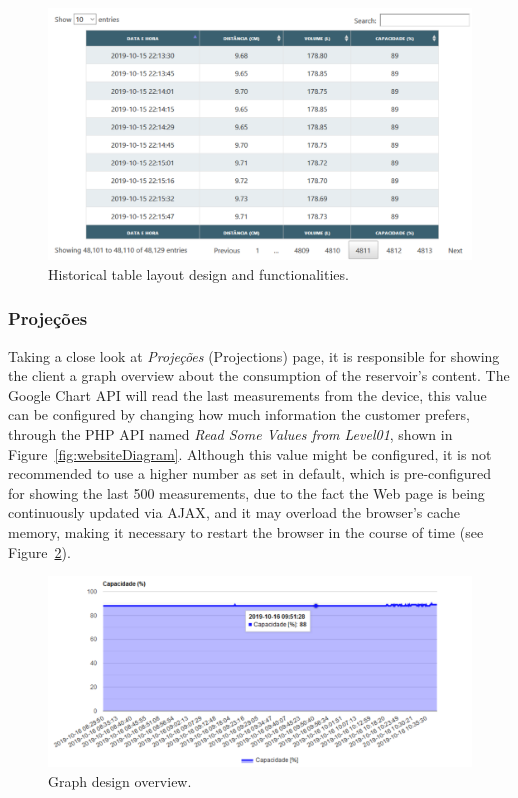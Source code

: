 \begin{figure}[h!]
    \centering
    \includegraphics[scale=0.6]{images/Development/web_database/historico1.pdf}
    \caption{Historical table layout design and functionalities.}
    \label{fig:historicTable}
\end{figure}


\subsubsection{Projeções}

Taking a close look at \textit{Projeções} (Projections) page, it is responsible for showing the client a graph overview about the consumption of the reservoir's content. The Google Chart \gls{API} will read the last measurements from the device, this value can be configured by changing how much information the customer prefers, through the \gls{PHP} \gls{API} named \textit{Read Some Values from Level01}, shown in Figure~\ref{fig:websiteDiagram}. Although this value might be configured, it is not recommended to use a higher number as set in default, which is pre-configured for showing the last 500 measurements, due to the fact the Web page is being continuously updated via \gls{AJAX}, and it may overload the browser's cache memory, making it necessary to restart the browser in the course of time (see Figure~\ref{fig:projections}).

\begin{figure}[h!]
    \centering
    \includegraphics[scale=0.6]{images/Development/web_database/projecoes1.pdf}
    \caption{Graph design overview.}
    \label{fig:projections}
\end{figure}


